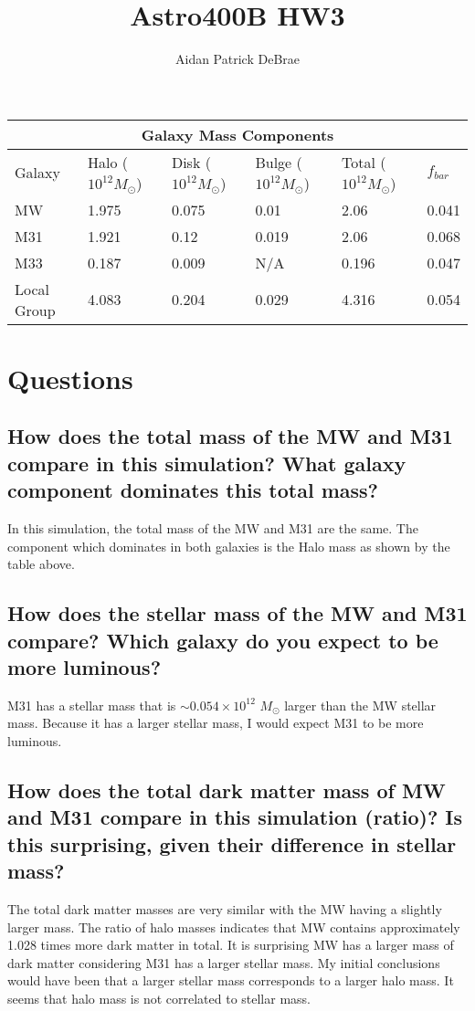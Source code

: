 \documentclass{article}
\title{Astro400B HW3}
\author{Aidan Patrick DeBrae}
\begin{document}
\maketitle
\begin{tabularx}{\textwidth}{|X|X|X|X|X|X|}
 \hline
 \multicolumn{6}{|c|}{Galaxy Mass Components} \\
 \hline
 Galaxy & Halo ($10^{12} M_\odot$) & Disk ($10^{12} M_\odot$) & Bulge ($10^{12} M_\odot$) & Total ($10^{12} M_\odot$) & $f_{bar}$ \\
 \hline
 MW & 1.975 & 0.075 & 0.01 & 2.06 & 0.041 \\
 M31 & 1.921 & 0.12 & 0.019 & 2.06 & 0.068 \\
 M33 & 0.187 & 0.009 & N/A & 0.196 & 0.047 \\
 Local Group & 4.083 & 0.204 & 0.029 & 4.316 & 0.054 \\
 \hline
\end{tabularx}

\vspace{3mm}
\section*{Questions}
\vspace{1mm}
\subsection{How does the total mass of the MW and M31 compare in this simulation? What galaxy component dominates this total mass?}
\hspace{10mm} In this simulation, the total mass of the MW and M31 are the same. The component which dominates in both galaxies is the Halo mass as shown by the table above. 
\vspace{1mm}
\subsection{How does the stellar mass of the MW and M31 compare? Which galaxy do you expect to be more luminous?}
\hspace{10mm} M31 has a stellar mass that is $\sim 0.054\times10^{12}$ \(M_\odot\) larger than the MW stellar mass. Because it has a larger stellar mass, I would expect M31 to be more luminous.
\vspace{1mm}
\subsection{How does the total dark matter mass of MW and M31 compare in this simulation (ratio)? Is this surprising, given their difference in stellar mass?}
\hspace{10mm} The total dark matter masses are very similar with the MW having a slightly larger mass. The ratio of halo masses indicates that MW contains approximately 1.028 times more dark matter in total. It is surprising MW has a larger mass of dark matter considering M31 has a larger stellar mass. My initial conclusions would have been that a larger stellar mass corresponds to a larger halo mass. It seems that halo mass is  not correlated to stellar mass.
\vspace{1mm}
\end{document}
